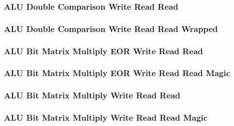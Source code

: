 \subsubsection[{\small ALU Double Comparison Write Read Read}]{ALU Double Comparison Write Read Read} \label{sec:format-ALU-DCWRR}



\subsubsection[{\small ALU Double Comparison Write Read Read Wrapped}]{ALU Double Comparison Write Read Read Wrapped} \label{sec:format-ALU-DCWRR.W}



\subsubsection[{\small ALU Bit Matrix Multiply EOR Write Read Read}]{ALU Bit Matrix Multiply EOR Write Read Read} \label{sec:format-ALU-DBMWRRR}



\subsubsection[{\small ALU Bit Matrix Multiply EOR Write Read Read Magic}]{ALU Bit Matrix Multiply EOR Write Read Read Magic} \label{sec:format-ALU-DBMWRRR.M}



\subsubsection[{\small ALU Bit Matrix Multiply Write Read Read}]{ALU Bit Matrix Multiply Write Read Read} \label{sec:format-ALU-DBMWRR}



\subsubsection[{\small ALU Bit Matrix Multiply Write Read Read Magic}]{ALU Bit Matrix Multiply Write Read Read Magic} \label{sec:format-ALU-DBMWRR.M}

